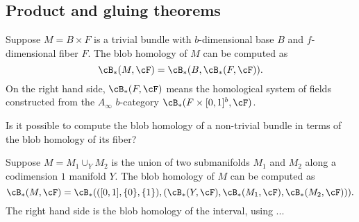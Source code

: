 \subsection{Product and gluing theorems}

\begin{thm}
Suppose $M = B \times F$ is a trivial bundle with $b$-dimensional base $B$ and $f$-dimensional fiber $F$. The blob homology of $M$ can be computed as
\begin{equation*}
\cB_*(M, \cF) = \cB_*(B, \cB_*(F, \cF)).
\end{equation*}
On the right hand side, $\cB_*(F, \cF)$ means the homological system of fields constructed from the $A_\infty$ $b$-category $\cB_*(F \times [0,1]^b, \cF)$.
\end{thm}

\begin{question}
Is it possible to compute the blob homology of a non-trivial bundle in terms of the blob homology of its fiber?
\end{question}

\begin{thm}
Suppose $M = M_1 \cup_Y M_2$ is the union of two submanifolds $M_1$ and $M_2$ along a codimension $1$ manifold $Y$. The blob homology of $M$ can be computed as
\begin{equation*}
\cB_*(M, \cF) = \cB_*(([0,1], \{0\}, \{1\}), (\cB_*(Y, \cF), \cB_*(M_1, \cF), \cB_*(M_2, \cF))).
\end{equation*}
The right hand side is the blob homology of the interval, using ...
\end{thm}